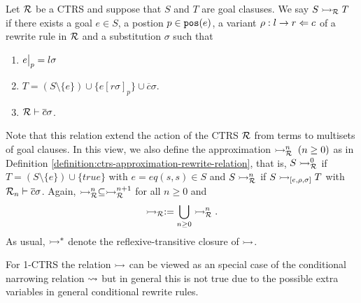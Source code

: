 \begin{definition}\label{definition:rewrite-on-goals}
    Let $\mathcal{R}$ be a CTRS and suppose that $S$ and $T$ are goal clasuses. We say $S \rightarrowtail_{\mathcal{R}} T$ if there exists a goal $e \in S$, a postion $p \in \mathtt{pos}(e)$, a variant $\rho : l \rightarrow r \Leftarrow c$ of a rewrite rule in $\mathcal{R}$ and a substitution $\sigma$ such that
    \begin{enumerate}
        \item $\restr{e}{p} = l \sigma$
        \item $T = (S \setminus \{e\}) \cup \{ e[r\sigma]_p \} \cup \overline{c} \sigma$.
        \item $\mathcal{R} \vdash \overline{c} \sigma$.
    \end{enumerate}
\end{definition}

Note that this relation extend the action of the CTRS $\mathcal{R}$ from terms to multisets of goal clauses. In this view, we also define the approximation $\rightarrowtail_{\mathcal{R}}^n \; (n \geq 0)$ as in Definition \ref{definition:ctrs-approximation-rewrite-relation}, that is, $S \rightarrowtail_{\mathcal{R}}^0$ if $T = (S \setminus \{e\}) \cup \{true\}$ with $e = eq(s,s) \in S$ and $S \rightarrowtail_{\mathcal{R}}^n$ if $S \rightarrowtail_{[e, \rho, \sigma]} T$ with $\mathcal{R}_n \vdash \overline{c} \sigma$. Again, $\rightarrowtail_{\mathcal{R}}^n \subseteq \rightarrowtail_{\mathcal{R}}^{n+1}$ for all $n \geq 0$ and
$$\rightarrowtail_{\mathcal{R}} := \bigcup\limits_{n \geq 0} \rightarrowtail_{\mathcal{R}}^n.$$
As usual, $\rightarrowtail^*$ denote the reflexive-transitive closure of $\rightarrowtail$.
\begin{remark}
    For 1-CTRS the relation $\rightarrowtail$ can be viewed as an special case of the conditional narrowing relation $\mathbin{\rightsquigarrow}$ but in general this is not true due to the possible extra variables in general conditional rewrite rules.
\end{remark}

